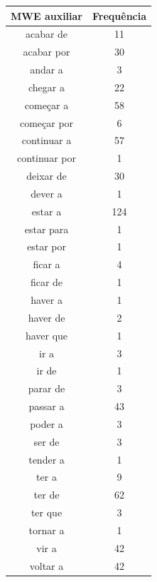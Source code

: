 \documentclass[output=paper,colorlinks,citecolor=brown]{langscibook}
\begin{document}
			\begin{table}[]
				\parbox{.45\linewidth}{
					\centering
					\begin{tabular}{|c|c|}
						\hline
						\textbf{MWE auxiliar} & \textbf{Frequência} \\\hline
							acabar de & 11\\\hline
							acabar por & 30\\\hline
							andar a & 3\\\hline
							chegar a & 22\\\hline
							começar a & 58\\\hline
							começar por & 6\\\hline
							continuar a & 57\\\hline
							continuar por & 1\\\hline
							deixar de & 30\\\hline
							dever a & 1\\\hline
							estar a & 124\\\hline
							estar para & 1\\\hline
							estar por & 1\\\hline
							ficar a & 4\\\hline
							ficar de & 1\\\hline
							haver a & 1\\\hline
							haver de & 2\\\hline
							haver que & 1\\\hline
							ir a & 3\\\hline
							ir de & 1\\\hline
							parar de & 3\\\hline
							passar a & 43\\\hline
							poder a & 3\\\hline
							ser de & 3\\\hline
							tender a & 1\\\hline
							ter a & 9\\\hline
							ter de & 62\\\hline
							ter que & 3\\\hline
							tornar a & 1\\\hline
							vir a & 42\\\hline
							voltar a & 42\\\hline
					\end{tabular}
				}
				\hfill
				\parbox{.45\linewidth}{
					\centering
					\begin{tabular}{|c|c|}
						\hline

\end{tabular}}
\end{table}
\end{document}
